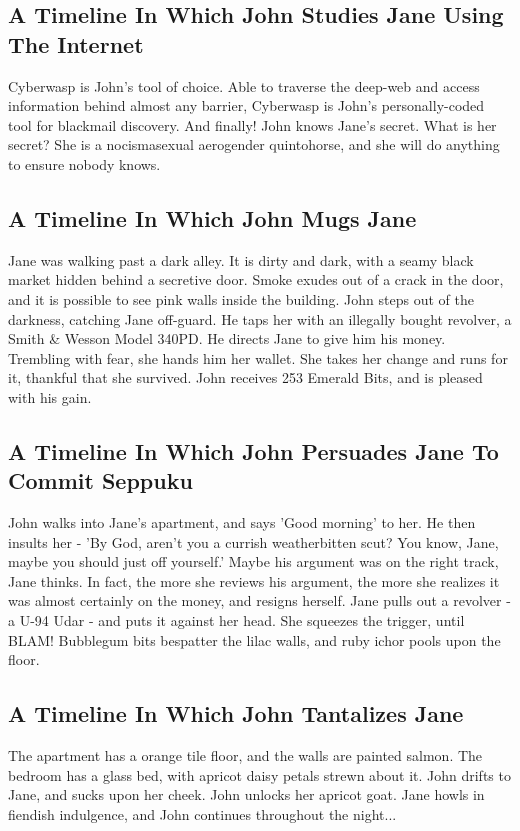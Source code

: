 \documentclass{article}
\begin{document}
\subsection{A Timeline In Which John Studies Jane Using The Internet}


Cyberwasp is John's tool of choice. Able to traverse the deep{-}web and access information behind almost any barrier, Cyberwasp is John's personally{-}coded tool for blackmail discovery.
And finally!
John knows Jane's secret. What is her secret? She is a nocismasexual aerogender quintohorse, and she will do anything to ensure nobody knows.
\subsection{A Timeline In Which John Mugs Jane}


Jane was walking past a dark alley.
It is dirty and dark, with a seamy black market hidden behind a secretive door.
Smoke exudes out of a crack in the door, and it is possible to see pink walls inside the building.
John steps out of the darkness, catching Jane off{-}guard.
He taps her with an illegally bought revolver, a Smith \& Wesson Model 340PD.
He directs Jane to give him his money.
Trembling with fear, she hands him her wallet.
She takes her change and runs for it, thankful that she survived.
John receives 253 Emerald Bits, and is pleased with his gain.
\subsection{A Timeline In Which John Persuades Jane To Commit Seppuku}


John walks into Jane's apartment, and says 'Good morning' to her.
He then insults her {-} 'By God, aren't you a currish weatherbitten scut?
You know, Jane, maybe you should just off yourself.'
Maybe his argument was on the right track, Jane thinks.
In fact, the more she reviews his argument, the more she realizes it was almost certainly on the money, and resigns herself.
Jane pulls out a revolver {-} a U{-}94 Udar {-} and puts it against her head.
She squeezes the trigger, until BLAM!
Bubblegum bits bespatter the lilac walls, and ruby ichor pools upon the floor.
\subsection{A Timeline In Which John Tantalizes Jane}


The apartment has a orange tile floor, and the walls are painted salmon.
The bedroom has a glass bed, with apricot daisy petals strewn about it.
John drifts to Jane, and sucks upon her cheek.
John unlocks her apricot goat.
Jane howls in fiendish indulgence, and John continues throughout the night...
\end{document}
